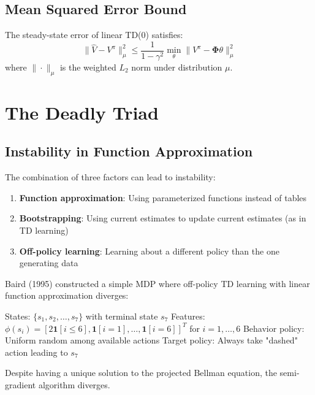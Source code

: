 \subsection{Mean Squared Error Bound}

\begin{theorem}
The steady-state error of linear TD(0) satisfies:
\begin{equation}
\|\hat{V} - V^\pi\|_\mu^2 \leq \frac{1}{1-\gamma^2} \min_\theta \|V^\pi - \mathbf{\Phi}\theta\|_\mu^2
\end{equation}
where $\|\cdot\|_\mu$ is the weighted $L_2$ norm under distribution $\mu$.
\end{theorem}

\section{The Deadly Triad}

\subsection{Instability in Function Approximation}

The combination of three factors can lead to instability:

\begin{enumerate}
\item \textbf{Function approximation}: Using parameterized functions instead of tables
\item \textbf{Bootstrapping}: Using current estimates to update current estimates (as in TD learning)
\item \textbf{Off-policy learning}: Learning about a different policy than the one generating data
\end{enumerate}

\begin{examplebox}
Baird (1995) constructed a simple MDP where off-policy TD learning with linear function approximation diverges:

States: $\{s_1, s_2, \ldots, s_7\}$ with terminal state $s_7$
Features: $\phi(s_i) = [2\mathbf{1}[i \leq 6], \mathbf{1}[i = 1], \ldots, \mathbf{1}[i = 6]]^T$ for $i = 1, \ldots, 6$
Behavior policy: Uniform random among available actions
Target policy: Always take "dashed" action leading to $s_7$

Despite having a unique solution to the projected Bellman equation, the semi-gradient algorithm diverges.
\end{examplebox}


